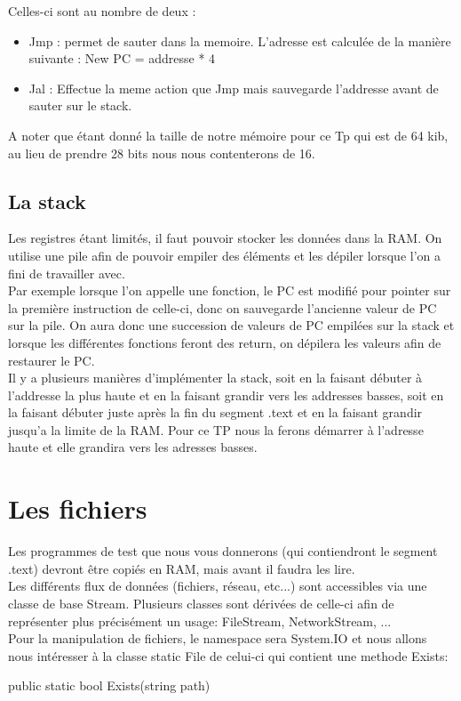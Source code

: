 Celles-ci sont au nombre de deux :
\begin{itemize}
  \item Jmp : permet de sauter dans la memoire. L'adresse est calculée de la
    manière suivante : New PC = addresse * 4
  \item Jal : Effectue la meme action que Jmp mais sauvegarde l'addresse avant
    de sauter sur le stack.
\end{itemize}

A noter que étant donné la taille de notre mémoire pour ce Tp qui est de 64 kib,
au lieu de prendre 28 bits nous nous contenterons de 16.


\subsection{La stack}
Les registres étant limités, il faut pouvoir stocker les données dans la RAM. On
utilise une pile afin de pouvoir empiler des éléments et les dépiler lorsque
l'on a fini de travailler avec.\\ Par exemple lorsque l'on appelle une fonction,
le PC est modifié pour pointer sur la première instruction de celle-ci, donc on
sauvegarde l'ancienne valeur de PC sur la pile. On aura donc une succession de
valeurs de PC empilées sur la stack et lorsque les différentes fonctions feront
des return, on dépilera les valeurs afin de restaurer le PC.\\ Il y a plusieurs
manières d'implémenter la stack, soit en la faisant débuter à l'addresse la plus
haute et en la faisant grandir vers les addresses basses, soit en la faisant
débuter juste après la fin du segment .text et en la faisant grandir jusqu'a la
limite de la RAM. Pour ce TP nous la ferons démarrer à l'adresse haute et elle
grandira vers les adresses basses.

\section {Les fichiers} Les programmes de test que nous vous donnerons (qui
contiendront le segment .text) devront être copiés en RAM, mais avant il faudra
les lire.\\ Les différents flux de données (fichiers, réseau, etc...) sont
accessibles via une classe de base Stream. Plusieurs classes sont dérivées de
celle-ci afin de représenter plus précisément un usage: FileStream,
NetworkStream, ...\\ Pour la manipulation de fichiers, le namespace sera
System.IO et nous allons nous intéresser à la classe static File de celui-ci qui
contient une methode Exists:
\begin{code}
  public static bool Exists(string path)
\end{code}

